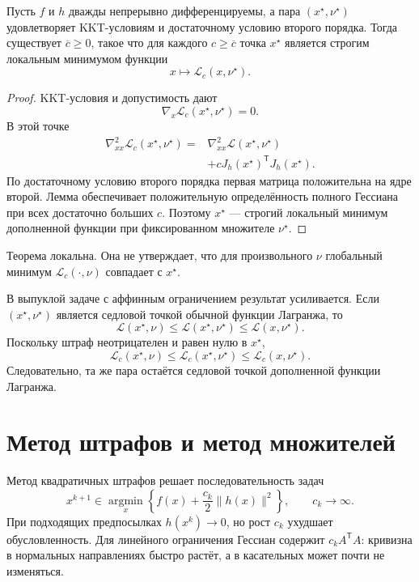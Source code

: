 \begin{theorem}
Пусть \(f\) и \(h\) дважды непрерывно дифференцируемы, а пара
\((x^\star,\nu^\star)\) удовлетворяет KKT-условиям и достаточному
условию второго порядка. Тогда существует \(\overline c\ge0\), такое
что для каждого \(c\ge\overline c\) точка \(x^\star\) является
строгим локальным минимумом функции
\[
    x\longmapsto\mathcal L_c(x,\nu^\star).
\]
\end{theorem}

\begin{proof}
KKT-условия и допустимость дают
\[
    \nabla_x\mathcal L_c(x^\star,\nu^\star)=0.
\]
В этой точке
\[
\begin{aligned}
    \nabla_{xx}^2
    \mathcal L_c(x^\star,\nu^\star)
    ={}&
    \nabla_{xx}^2
    \mathcal L(x^\star,\nu^\star)
    \\
    &+
    cJ_h(x^\star)^{\mathsf T}J_h(x^\star).
\end{aligned}
\]
По достаточному условию второго порядка первая матрица положительна на
ядре второй. Лемма обеспечивает положительную определённость полного
Гессиана при всех достаточно больших \(c\). Поэтому \(x^\star\) —
строгий локальный минимум дополненной функции при фиксированном
множителе \(\nu^\star\).
\end{proof}

Теорема локальна. Она не утверждает, что для произвольного \(\nu\)
глобальный минимум \(\mathcal L_c(\cdot,\nu)\) совпадает с
\(x^\star\).

В выпуклой задаче с аффинным ограничением результат усиливается. Если
\((x^\star,\nu^\star)\) является седловой точкой обычной функции
Лагранжа, то
\[
    \mathcal L(x^\star,\nu)
    \le
    \mathcal L(x^\star,\nu^\star)
    \le
    \mathcal L(x,\nu^\star).
\]
Поскольку штраф неотрицателен и равен нулю в \(x^\star\),
\[
    \mathcal L_c(x^\star,\nu)
    \le
    \mathcal L_c(x^\star,\nu^\star)
    \le
    \mathcal L_c(x,\nu^\star).
\]
Следовательно, та же пара остаётся седловой точкой дополненной
функции Лагранжа.

\section{Метод штрафов и метод множителей}

Метод квадратичных штрафов решает последовательность задач
\[
    x^{k+1}
    \in
    \operatorname*{argmin}_x
    \left\{
        f(x)
        +
        \frac{c_k}{2}\lVert h(x)\rVert^2
    \right\},
    \qquad
    c_k\to\infty.
\]
При подходящих предпосылках \(h(x^k)\to0\), но рост \(c_k\) ухудшает
обусловленность. Для линейного ограничения Гессиан содержит
\(c_kA^{\mathsf T}A\): кривизна в нормальных направлениях быстро
растёт, а в касательных может почти не изменяться.

